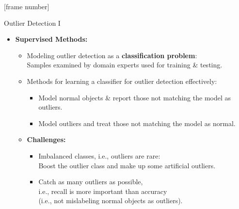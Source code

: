 \documentclass[aspectratio=169,t,xcolor=dvipsnames]{beamer}
\begin{document}
{
[frame number]
\begin{frame}{Outlier Detection I}
    \begin{itemize}
        \item \textbf{Supervised Methods:}
        \begin{itemize}
            \item Modeling outlier detection as a \textbf{classification problem}:\\
            Samples examined by domain experts used for training \& testing.
            \item Methods for learning a classifier for outlier detection effectively:
            \begin{itemize}
              \item Model normal objects \& report those not matching the model as outliers.
              \item Model outliers and treat those not matching the model as normal.
            \end{itemize}
            \item \textbf{Challenges:}
            \begin{itemize}
                \item Imbalanced classes, i.e., outliers are rare: \\
                Boost the outlier class and make up some artificial outliers.
                \item Catch as many outliers as possible, \\
                i.e., recall is more important than accuracy \\
                (i.e., not mislabeling normal objects as outliers).
                \end{itemize}
            \end{itemize}
    \end{itemize}
\end{frame}
}
\end{document}
